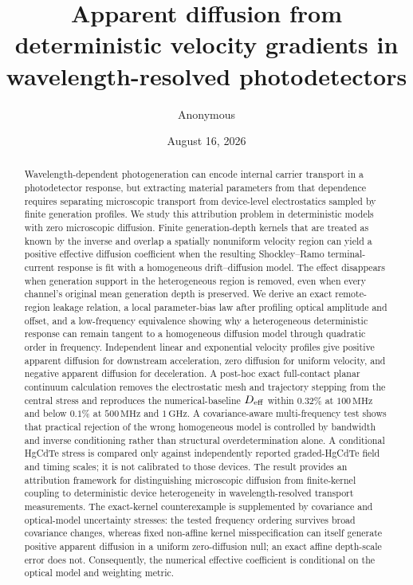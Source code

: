 \documentclass[aps,pra,twocolumn,superscriptaddress,nofootinbib]{revtex4-2}
\begin{document}
\title{Apparent diffusion from deterministic velocity gradients in wavelength-resolved photodetectors}

\author{Anonymous}

\date{August 16, 2026}

\begin{abstract}
Wavelength-dependent photogeneration can encode internal carrier transport in a photodetector response, but extracting material parameters from that dependence requires separating microscopic transport from device-level electrostatics sampled by finite generation profiles. We study this attribution problem in deterministic models with zero microscopic diffusion. Finite generation-depth kernels that are treated as known by the inverse and overlap a spatially nonuniform velocity region can yield a positive effective diffusion coefficient when the resulting Shockley--Ramo terminal-current response is fit with a homogeneous drift--diffusion model. The effect disappears when generation support in the heterogeneous region is removed, even when every channel's original mean generation depth is preserved. We derive an exact remote-region leakage relation, a local parameter-bias law after profiling optical amplitude and offset, and a low-frequency equivalence showing why a heterogeneous deterministic response can remain tangent to a homogeneous diffusion model through quadratic order in frequency. Independent linear and exponential velocity profiles give positive apparent diffusion for downstream acceleration, zero diffusion for uniform velocity, and negative apparent diffusion for deceleration. A post-hoc exact full-contact planar continuum calculation removes the electrostatic mesh and trajectory stepping from the central stress and reproduces the numerical-baseline $D_{\rm eff}$ within $0.32\%$ at $100\,\mathrm{MHz}$ and below $0.1\%$ at $500\,\mathrm{MHz}$ and $1\,\mathrm{GHz}$. A covariance-aware multi-frequency test shows that practical rejection of the wrong homogeneous model is controlled by bandwidth and inverse conditioning rather than structural overdetermination alone. A conditional HgCdTe stress is compared only against independently reported graded-HgCdTe field and timing scales; it is not calibrated to those devices. The result provides an attribution framework for distinguishing microscopic diffusion from finite-kernel coupling to deterministic device heterogeneity in wavelength-resolved transport measurements.
The exact-kernel counterexample is supplemented by covariance and optical-model uncertainty stresses: the tested frequency ordering survives broad covariance changes, whereas fixed non-affine kernel misspecification can itself generate positive apparent diffusion in a uniform zero-diffusion null; an exact affine depth-scale error does not. Consequently, the numerical effective coefficient is conditional on the optical model and weighting metric.

\end{abstract}
\end{document}
